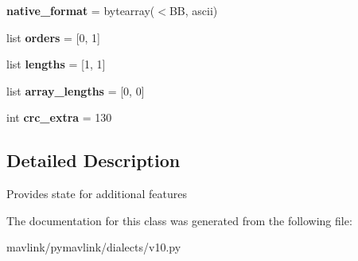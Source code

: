 \begin{DoxyCompactItemize}
{\bfseries native\+\_\+format} = bytearray(\textquotesingle{}$<$BB\textquotesingle{}, \textquotesingle{}ascii\textquotesingle{})
\item 
\mbox{\label{classpymavlink_1_1dialects_1_1v10_1_1MAVLink__extended__sys__state__message_a6ccaef1d5b084044864f4ed23ce22030}} 
list {\bfseries orders} = \mbox{[}0, 1\mbox{]}
\item 
\mbox{\label{classpymavlink_1_1dialects_1_1v10_1_1MAVLink__extended__sys__state__message_ad938bd423b470ace80ec32cab27ea4a6}} 
list {\bfseries lengths} = \mbox{[}1, 1\mbox{]}
\item 
\mbox{\label{classpymavlink_1_1dialects_1_1v10_1_1MAVLink__extended__sys__state__message_aa5669b806985982347db6c50808fe94e}} 
list {\bfseries array\+\_\+lengths} = \mbox{[}0, 0\mbox{]}
\item 
\mbox{\label{classpymavlink_1_1dialects_1_1v10_1_1MAVLink__extended__sys__state__message_abccb8382ff6bcb44344c2a9e0b055c4a}} 
int {\bfseries crc\+\_\+extra} = 130
\end{DoxyCompactItemize}


\subsection{Detailed Description}
\begin{DoxyVerb}Provides state for additional features
\end{DoxyVerb}
 

The documentation for this class was generated from the following file\+:\begin{DoxyCompactItemize}
\item 
mavlink/pymavlink/dialects/v10.\+py\end{DoxyCompactItemize}

